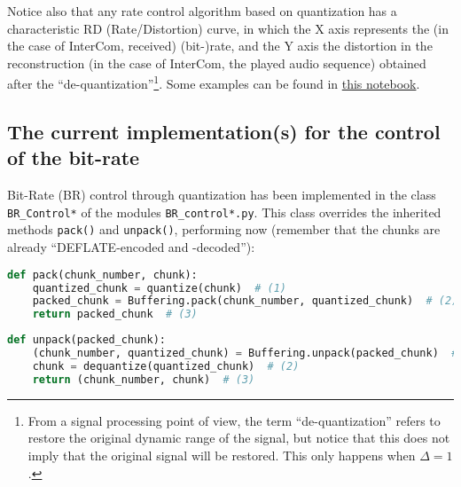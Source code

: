 Notice also that any rate control algorithm based on quantization has
a characteristic RD (Rate/Distortion) curve, in which the X axis
represents the (in the case of InterCom, received) (bit-)rate, and the Y
axis the distortion in the reconstruction (in the case of InterCom,
the played audio sequence) obtained after the
``de-quantization''\footnote{From a signal processing point of view,
  the term ``de-quantization'' refers to restore the original dynamic
  range of the signal, but notice that this does not imply that the
  original signal will be restored. This only happens when
  $\Delta=1$.}. Some examples can be found in
\href{https://github.com/Tecnologias-multimedia/Tecnologias-multimedia.github.io/blob/master/contents/BR_control/audio_quantization.ipynb}{this
  notebook}.

\subsection{The current implementation(s) for the control of the bit-rate}
Bit-Rate (BR) control through quantization has been implemented in the
class \verb|BR_Control*| of the modules \texttt{BR\_control*.py}. This
class overrides the inherited methods \verb|pack()| and
\verb|unpack()|, performing now (remember that the chunks are already
``DEFLATE-encoded and -decoded''):

\begin{lstlisting}[language=Python]
  def pack(chunk_number, chunk):
    quantized_chunk = quantize(chunk)  # (1)
    packed_chunk = Buffering.pack(chunk_number, quantized_chunk)  # (2)
    return packed_chunk  # (3)
\end{lstlisting}

\begin{lstlisting}[language=Python]
  def unpack(packed_chunk):
    (chunk_number, quantized_chunk) = Buffering.unpack(packed_chunk)  # (1)
    chunk = dequantize(quantized_chunk)  # (2)
    return (chunk_number, chunk)  # (3)
\end{lstlisting}

